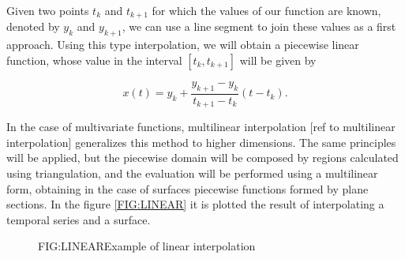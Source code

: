 
Given two points $t_k$ and $t_{k+1}$ for which the values of our function are
known, denoted by $y_k$ and $y_{k+1}$, we can use a line segment to join these
values as a first approach. Using this type interpolation, we will obtain a
piecewise linear function, whose value in the interval $[t_k, t_{k+1}]$ will
be given by

$$
x(t)= y_{k}+\frac{y_{k+1}-y_{k}}{t_{k+1}-t_{k}}\left(t-t_{k}\right).
$$

In the case of multivariate functions, multilinear interpolation
[ref to multilinear interpolation] generalizes this method to higher dimensions.
The same principles will be applied, but the piecewise domain will be composed
by regions calculated using triangulation, and the evaluation will be performed
using a multilinear form, obtaining in the case of surfaces piecewise
functions formed by plane sections. In the figure \ref{FIG:LINEAR} it is plotted
the result of interpolating a temporal series and a surface.


\begin{figure}[Example of linear interpolation]{FIG:LINEAR}{Example of linear interpolation}
   \quad
\end{figure}

